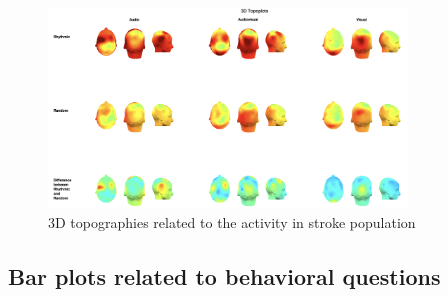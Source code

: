 \begin{figure}[htbp]
    \centering
    \includegraphics[width=0.85\textwidth]{stroke_images/3d_topographies.png}
    \caption{3D topographies related to the activity in stroke population}
    \label{fig: 3D topographies stroke group}   
\end{figure} 

\clearpage
\subsection*{Bar plots related to behavioral questions}

